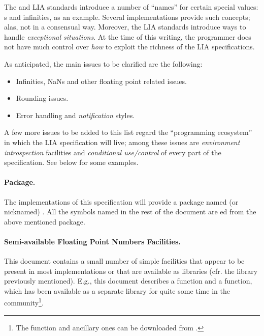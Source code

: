 \documentclass[../../CDR-IEEE-754-support.tex]{subfiles}
\begin{document}
The \IEEEFPStd{} and LIA standards introduce a number of ``names'' for
certain special values: s and infinities, as an example.
Several \CL{} implementations provide such concepts; alas, not in a
consensual way.  Moreover, the LIA standards introduce ways to handle
\emph{exceptional situations}. At the time of this writing, the \CL{}
programmer does not have much control over \emph{how} to exploit the
richness of the LIA specifications.


\noindent
As anticipated, the main issues to be clarified are the following:
\begin{itemize}
\item Infinities, \textsf{NaN}s and other floating point related
  issues.
\item Rounding issues.
\item Error handling and \emph{notification} styles.
\end{itemize}
%
A few more issues to be added to this list regard the ``programming
ecosystem'' in which the \CL{} LIA specification will live; among
these issues are \emph{environment introspection} facilities and
\emph{conditional use/control} of every part of the \CL{}
specification. See below for some examples.


\paragraph{\CLLIAPKG{} Package.}
\label{sect:package}
%
The implementations of this specification will provide a package named
(or nicknamed) \CLLIAPKG{}.  All the symbols named in the rest
of the document are ed from the above mentioned package.


\paragraph{Semi-available Floating Point Numbers Facilities.}
%
This document contains a small number of simple facilities that appear
to be present in most \CL{} implementations or that are available as
libraries (cfr. the  library previously mentioned).  E.g., this document describes a  function
and a  function, which has been available as a
separate library for quite some time in the community\footnote{The
   function and ancillary ones can be downloaded
  from \Quicklisp{} \cite{2008:Beane:Quicklisp}.}.
\end{document}
